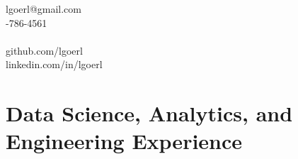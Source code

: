 \documentclass[a4paper,10pt,notitlepage]{article}
\begin{document}
\begin{multicols}{2}{
\noindent %

\noindent lgoerl@gmail.com\\
-786-4561\\
\\
\hspace*{-10pt}\hfill github.com/lgoerl\\
\hspace*{-10pt}\hfill linkedin.com/in/lgoerl\\
}
\end{multicols}
\section*{Data Science, Analytics, and Engineering Experience}
\end{document}
